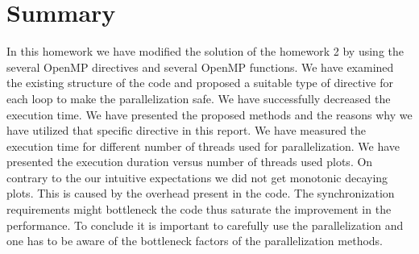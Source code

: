 \section{Summary}
In this homework we have modified the solution of the homework 2 by using the several OpenMP directives and several OpenMP functions. We have examined the existing structure of the code and proposed a suitable type of directive for each loop to make the parallelization safe. We have successfully decreased the execution time. We have presented the proposed methods and the reasons why we have utilized that specific directive in this report. We have measured the execution time for different number of threads used for parallelization. We have presented the execution duration versus number of threads used plots. On contrary to the our intuitive expectations we did not get monotonic decaying plots. This is caused by the overhead present in the code. The synchronization requirements might bottleneck the code thus saturate the improvement in the performance. To conclude it is important to carefully use the parallelization and one has to be aware of the bottleneck factors of the parallelization methods.
